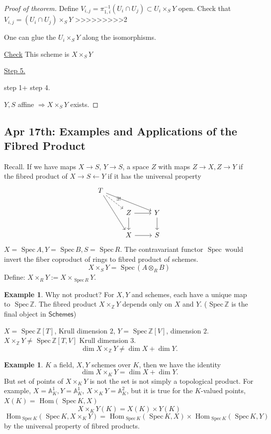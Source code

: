 \documentclass[11pt]{article}
\theoremstyle{definition}
\newtheorem{ex}[thm]{Example}
\renewcommand{\hom}{\text{ Hom}}
\newcommand{\spec}{\text{ Spec}\,}
\newcommand{\affn}{\mathbb A}
\newcommand{\intg}{\mathbb Z}
\newcommand{\Lrta}{\Longrightarrow}
\newcommand{\lrta}{\longrightarrow}
\begin{document}
\begin{proof}[Proof of theorem]
Define $V_{i,j}=\pi_{1,i}^{-1}(U_i\cap U_j)\subset U_i\times_S Y$ open. Check that $V_{i,j}=(U_i\cap U_j)\times_S Y$
>>>>>>>>>2

One can glue  the $U_i\times_S Y$ along the isomorphisms. 

\underline{Check} This scheme is $X\times_S Y$

\underline{Step 5.}

step 1+ step 4.

$Y,S$ affine $\Lrta X\times_S Y$ exists.
\end{proof}

\subsection{Apr 17th: Examples and Applications of the Fibred Product}
Recall.
If we have maps
 $X\lrta S$, $Y\lrta S$, a space $Z$ with maps $Z\lrta X, Z\lrta Y$ if the fibred product of $X\lrta S\longleftarrow Y$ if it has the universal property
 $$
\begin{tikzcd}
T \arrow[rdd] \arrow[rrd] \arrow[rd, "\exists!", dashed] &  &  \\
 & Z \arrow[d] \arrow[r] & Y \arrow[d] \\
 & X \arrow[r] & S
\end{tikzcd}
 $$
 $X=\spec A, Y=\spec B, S=\spec R$. The contravariant functor $\spec$ would invert the fiber coproduct of rings to fibred product of schemes.
 $$
X\times_S Y=\spec( A\otimes_R B)
 $$
 Define: $X\times_R Y:=X\times_{\spec R} Y$.

\begin{ex}
Why not product?
For $X,Y$ and schemes, each have a unique map to $\spec \intg$. The fibred product $X\times_\intg Y$ depends only on $X$ and $Y$. ($\spec \intg$ is the final object in $\mathsf{Schemes}$)

$X=\spec \intg[T]$, Krull dimension $2$, $Y=\spec \intg[V]$, dimension $2$. $X\times_\intg Y\neq\spec \intg[T,V]$ Krull dimension $3$.
$$
\dim X\times_\intg Y\neq \dim X+\dim Y.
$$
\end{ex}

\begin{ex}
$K$ a field, $X, Y$ schemes over $K$, then we have the identity
 $$\dim X\times_K Y=\dim X+\dim Y.$$ But  set of points of $X\times_K Y$ is not the set is not simply a topological product. For example, $X=\affn^1_K, Y=\affn^1_K$, $X\times_K Y=\affn^2_K$, but it  is true for the $K$-valued points,  $X(K)=\hom(\spec K, X)$
$$
X\times_K Y(K)=X(K)\times Y(K)
$$
$$
\hom_{\spec K}(\spec K, X\times_K Y)=\hom_{\spec K}(\spec K, X)\times \hom_{\spec K}(\spec K, Y)
$$
by the universal property of fibred products.
\end{ex}
\end{document}
